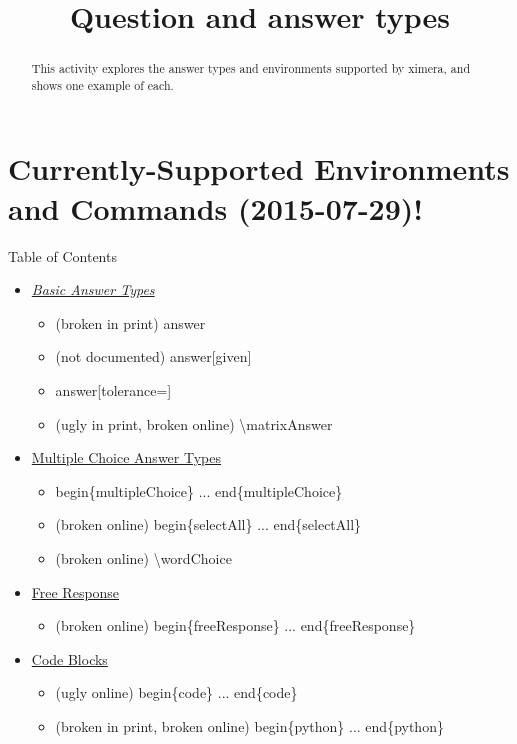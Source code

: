 \documentclass{ximera}
\title{Question and answer types}
\begin{document}
\begin{abstract}
  This activity explores the answer types and environments supported by ximera, and shows one example of each.
\end{abstract}

\maketitle

\section{Currently-Supported Environments and Commands (2015-07-29)!}

\begin{remark} Table of Contents

\begin{itemize}
\item \emph{\hyperref[BasicAnswerType]{Basic Answer Types}}
  \begin{itemize}
    \item (broken in print) answer
    \item (not documented) answer[given]
    \item answer[tolerance=]
    \item (ugly in print, broken online) \textbackslash matrixAnswer  
  \end{itemize}
\item \hyperref[MCAnswerType]{Multiple Choice Answer Types}
  \begin{itemize}
    \item begin\{multipleChoice\} ... end\{multipleChoice\}
    \item (broken online) begin\{selectAll\} ... end\{selectAll\}
    \item (broken online) \textbackslash wordChoice
  \end{itemize}    
\item \hyperref[FRAnswerType]{Free Response}
  \begin{itemize}   
    \item (broken online) begin\{freeResponse\} ... end\{freeResponse\}
  \end{itemize}
\item \hyperref[CodeAnswers]{Code Blocks}
  \begin{itemize}
    \item (ugly online) begin\{code\} ... end\{code\}
    \item (broken in print, broken online) begin\{python\} ... end\{python\}

\end{itemize}
\end{itemize}
\end{remark}
\end{document}
